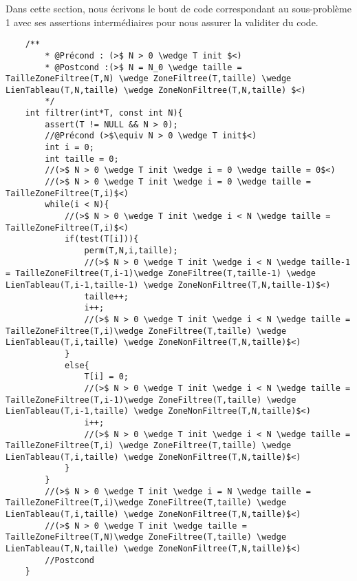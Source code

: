 \documentclass[a4paper, 11pt, oneside]{article}
\begin{document}
    Dans cette section, nous écrivons le bout de code correspondant au sous-problème 1 avec ses assertions
    intermédiaires pour nous assurer la validiter du code.
    \begin{lstlisting}
    /**
        * @Précond : (>$ N > 0 \wedge T init $<)
        * @Postcond :(>$ N = N_0 \wedge taille = TailleZoneFiltree(T,N) \wedge ZoneFiltree(T,taille) \wedge LienTableau(T,N,taille) \wedge ZoneNonFiltree(T,N,taille) $<)
        */
    int filtrer(int*T, const int N){
        assert(T != NULL && N > 0);
        //@Précond (>$\equiv N > 0 \wedge T init$<)
        int i = 0;
        int taille = 0;
        //(>$ N > 0 \wedge T init \wedge i = 0 \wedge taille = 0$<)
        //(>$ N > 0 \wedge T init \wedge i = 0 \wedge taille = TailleZoneFiltree(T,i)$<)
        while(i < N){
            //(>$ N > 0 \wedge T init \wedge i < N \wedge taille = TailleZoneFiltree(T,i)$<)
            if(test(T[i])){
                perm(T,N,i,taille);
                //(>$ N > 0 \wedge T init \wedge i < N \wedge taille-1 = TailleZoneFiltree(T,i-1)\wedge ZoneFiltree(T,taille-1) \wedge LienTableau(T,i-1,taille-1) \wedge ZoneNonFiltree(T,N,taille-1)$<)
                taille++;
                i++;
                //(>$ N > 0 \wedge T init \wedge i < N \wedge taille = TailleZoneFiltree(T,i)\wedge ZoneFiltree(T,taille) \wedge LienTableau(T,i,taille) \wedge ZoneNonFiltree(T,N,taille)$<)
            }
            else{
                T[i] = 0;
                //(>$ N > 0 \wedge T init \wedge i < N \wedge taille = TailleZoneFiltree(T,i-1)\wedge ZoneFiltree(T,taille) \wedge LienTableau(T,i-1,taille) \wedge ZoneNonFiltree(T,N,taille)$<)
                i++;
                //(>$ N > 0 \wedge T init \wedge i < N \wedge taille = TailleZoneFiltree(T,i) \wedge ZoneFiltree(T,taille) \wedge LienTableau(T,i,taille) \wedge ZoneNonFiltree(T,N,taille)$<)
            }
        }
        //(>$ N > 0 \wedge T init \wedge i = N \wedge taille = TailleZoneFiltree(T,i)\wedge ZoneFiltree(T,taille) \wedge LienTableau(T,i,taille) \wedge ZoneNonFiltree(T,N,taille)$<)
        //(>$ N > 0 \wedge T init \wedge taille = TailleZoneFiltree(T,N)\wedge ZoneFiltree(T,taille) \wedge LienTableau(T,N,taille) \wedge ZoneNonFiltree(T,N,taille)$<)
        //Postcond
    }    
    \end{lstlisting}
\end{document}
